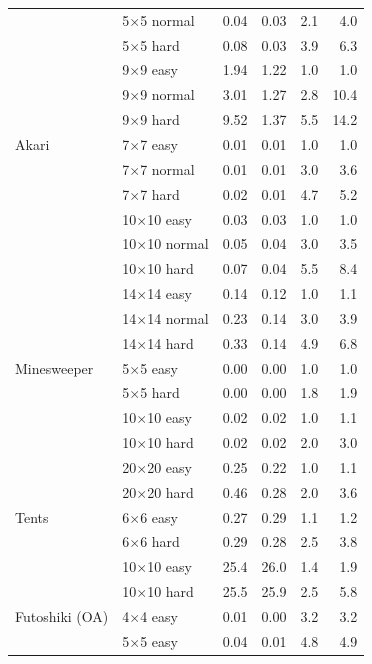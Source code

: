 \begin{table}[t]
\begin{tabular}{@{}ll rr rr@{}}
  & 5$\times$5 normal  & 0.04 & 0.03  &  2.1 &  4.0 \\
  & 5$\times$5 hard    & 0.08 & 0.03  &  3.9 &  6.3 \\
  & 9$\times$9 easy    & 1.94 & 1.22  &  1.0 &  1.0 \\
  & 9$\times$9 normal  & 3.01 & 1.27  &  2.8 & 10.4 \\
  & 9$\times$9 hard    & 9.52 & 1.37  &  5.5 & 14.2 \\
\addlinespace
Akari
  & 7$\times$7 easy    & 0.01 & 0.01  &  1.0 &  1.0 \\
  & 7$\times$7 normal  & 0.01 & 0.01  &  3.0 &  3.6 \\
  & 7$\times$7 hard    & 0.02 & 0.01  &  4.7 &  5.2 \\
  & 10$\times$10 easy  & 0.03 & 0.03  &  1.0 &  1.0 \\
  & 10$\times$10 normal& 0.05 & 0.04  &  3.0 &  3.5 \\
  & 10$\times$10 hard  & 0.07 & 0.04  &  5.5 &  8.4 \\
  & 14$\times$14 easy  & 0.14 & 0.12  &  1.0 &  1.1 \\
  & 14$\times$14 normal& 0.23 & 0.14  &  3.0 &  3.9 \\
  & 14$\times$14 hard  & 0.33 & 0.14  &  4.9 &  6.8 \\
\addlinespace
Minesweeper
  & 5$\times$5 easy    & 0.00 & 0.00  &  1.0 &  1.0 \\
  & 5$\times$5 hard    & 0.00 & 0.00  &  1.8 &  1.9 \\
  & 10$\times$10 easy  & 0.02 & 0.02  &  1.0 &  1.1 \\
  & 10$\times$10 hard  & 0.02 & 0.02  &  2.0 &  3.0 \\
  & 20$\times$20 easy  & 0.25 & 0.22  &  1.0 &  1.1 \\
  & 20$\times$20 hard  & 0.46 & 0.28  &  2.0 &  3.6 \\
\addlinespace
Tents
  & 6$\times$6 easy    & 0.27 & 0.29  &  1.1 &  1.2 \\
  & 6$\times$6 hard    & 0.29 & 0.28  &  2.5 &  3.8 \\
  & 10$\times$10 easy  &25.4  &26.0   &  1.4 &  1.9 \\
  & 10$\times$10 hard  &25.5  &25.9   &  2.5 &  5.8 \\
\midrule
Futoshiki (OA)
  & 4$\times$4 easy    & 0.01 & 0.00  &  3.2 &  3.2 \\
  & 5$\times$5 easy    & 0.04 & 0.01  &  4.8 &  4.9 \\

\end{tabular}
\end{table}
